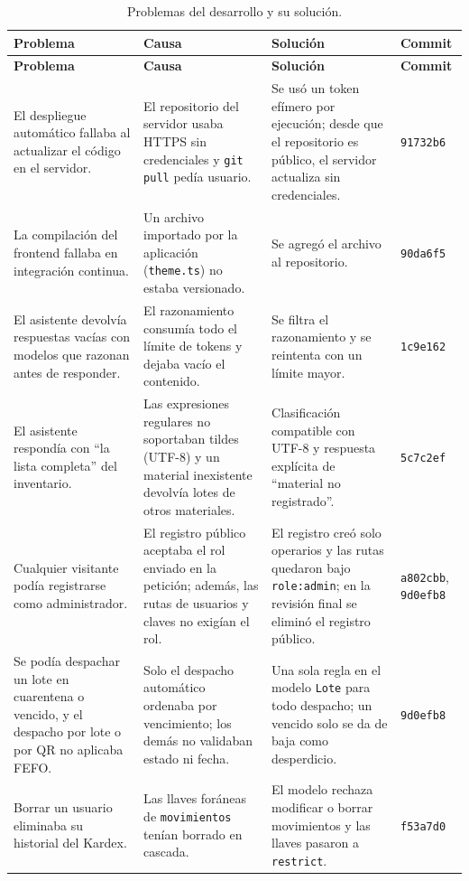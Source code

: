 {\small
\begin{longtable}{|p{3.6cm}|p{5.6cm}|p{4.2cm}|p{1.4cm}|}
\caption{Problemas del desarrollo y su solución.}
\label{tab:imp_problemas}\\
\hline
\textbf{Problema} & \textbf{Causa} & \textbf{Solución} & \textbf{Commit} \\
\hline
\endfirsthead
\hline
\textbf{Problema} & \textbf{Causa} & \textbf{Solución} & \textbf{Commit} \\
\hline
\endhead
El despliegue automático fallaba al actualizar el código en el servidor. & El repositorio del servidor usaba HTTPS sin credenciales y \texttt{git pull} pedía usuario. & Se usó un token efímero por ejecución; desde que el repositorio es público, el servidor actualiza sin credenciales. & \texttt{91732b6} \\ \hline
La compilación del frontend fallaba en integración continua. & Un archivo importado por la aplicación (\texttt{theme.ts}) no estaba versionado. & Se agregó el archivo al repositorio. & \texttt{90da6f5} \\ \hline
El asistente devolvía respuestas vacías con modelos que razonan antes de responder. & El razonamiento consumía todo el límite de tokens y dejaba vacío el contenido. & Se filtra el razonamiento y se reintenta con un límite mayor. & \texttt{1c9e162} \\ \hline
El asistente respondía con ``la lista completa'' del inventario. & Las expresiones regulares no soportaban tildes (UTF-8) y un material inexistente devolvía lotes de otros materiales. & Clasificación compatible con UTF-8 y respuesta explícita de ``material no registrado''. & \texttt{5c7c2ef} \\ \hline
Cualquier visitante podía registrarse como administrador. & El registro público aceptaba el rol enviado en la petición; además, las rutas de usuarios y claves no exigían el rol. & El registro creó solo operarios y las rutas quedaron bajo \texttt{role:admin}; en la revisión final se eliminó el registro público. & \texttt{a802cbb}, \texttt{9d0efb8} \\ \hline
Se podía despachar un lote en cuarentena o vencido, y el despacho por lote o por QR no aplicaba FEFO. & Solo el despacho automático ordenaba por vencimiento; los demás no validaban estado ni fecha. & Una sola regla en el modelo \texttt{Lote} para todo despacho; un vencido solo se da de baja como desperdicio. & \texttt{9d0efb8} \\ \hline
Borrar un usuario eliminaba su historial del Kardex. & Las llaves foráneas de \texttt{movimientos} tenían borrado en cascada. & El modelo rechaza modificar o borrar movimientos y las llaves pasaron a \texttt{restrict}. & \texttt{f53a7d0} \\ \hline

\end{longtable}}
